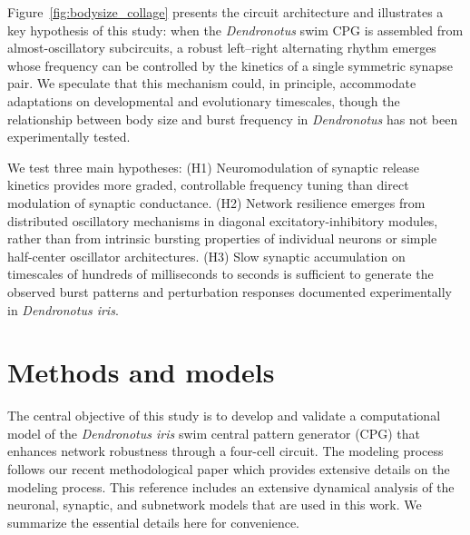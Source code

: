 \documentclass[nofootinbib,aip,amsmath,amssymb,preprint,twocolumn,floatfix,10pt]{revtex4-2}
\begin{document}
Figure~\ref{fig:bodysize_collage} presents the circuit architecture and illustrates a key hypothesis of this study: when the \textit{Dendronotus} swim CPG is assembled from almost-oscillatory subcircuits, a robust left–right alternating rhythm emerges whose frequency can be controlled by the kinetics of a single symmetric synapse pair. We speculate that this mechanism could, in principle, accommodate adaptations on developmental and evolutionary timescales, though the relationship between body size and burst frequency in \textit{Dendronotus} has not been experimentally tested.

We test three main hypotheses: (H1) Neuromodulation of synaptic release kinetics provides more graded, controllable frequency tuning than direct modulation of synaptic conductance. (H2) Network resilience emerges from distributed oscillatory mechanisms in diagonal excitatory-inhibitory modules, rather than from intrinsic bursting properties of individual neurons or simple half-center oscillator architectures. (H3) Slow synaptic accumulation on timescales of hundreds of milliseconds to seconds is sufficient to generate the observed burst patterns and perturbation responses documented experimentally in \textit{Dendronotus iris}.

\section{Methods and models}
%
The central objective of this study is to develop and validate a computational model of the \textit{Dendronotus iris} swim central pattern generator (CPG) that enhances network robustness through a four-cell circuit.
The modeling process follows our recent methodological paper \cite{scully2024pairing} which provides extensive details on the modeling process.
This reference includes an extensive dynamical analysis of the neuronal, synaptic, and subnetwork models that are used in this work. We summarize the essential details here for convenience.
\end{document}
